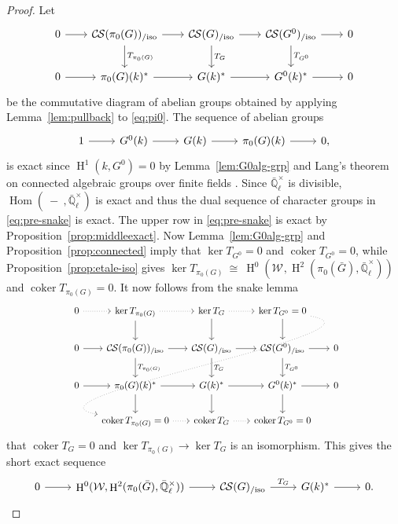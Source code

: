 \documentclass[10pt]{amsart}
\theoremstyle{plain}
\theoremstyle{definition}
\theoremstyle{remark}
\newcommand{\EE}{\mathbb{\bar Q}_\ell}
\newcommand{\Fq}{k}
\newcommand{\EEx}{\EE^\times}
\newcommand{\Weil}[1]{\mathcal{W}_{#1}}
\DeclareMathOperator{\Hom}{Hom}
\DeclareMathOperator{\coker}{coker}
\DeclareMathOperator{\Hh}{H}
\newcommand{\iso}{{\ \cong\ }}
\newcommand{\TrFrob}[1]{T_{#1}}
\newcommand{\CS}{{\mathcal{C\hskip-0.8pt S}}}
\newcommand{\CSiso}[1]{\CS(#1)_{/\text{iso}}}
\newcommand{\bG}{\bar{G}}
\begin{document}
\begin{proof}
  Let
  \begin{equation}\label{eq:pre-snake}
  \begin{tikzcd}[row sep=20, column sep=20]
    0 \rar & \CSiso{\pi_0(G)} \rar \dar{\TrFrob{\pi_0(G)}}
    & \CSiso{G} \rar \dar{\TrFrob{G}} & \CSiso{G^0} \rar \dar{\TrFrob{G^0}} & 0\\
    0 \rar & \pi_0(G)(\Fq)^* \rar
    &  G(\Fq)^* \rar & G^0(\Fq)^* \rar & 0
  \end{tikzcd}
  \end{equation}
  be the commutative diagram of abelian groups obtained by applying
  Lemma~\ref{lem:pullback} to \eqref{eq:pi0}.
  The sequence of abelian groups
\[
  \begin{tikzcd}
    1 \rar & G^0(\Fq) \rar & G(\Fq) \rar & \pi_0(G)(\Fq) \rar & 0,
  \end{tikzcd}
\]
  is exact since $\Hh^1(\Fq,G^0) =0$ by Lemma~\ref{lem:G0alg-grp} and Lang's theorem on connected algebraic groups over finite fields \cite{lang:56a}.
  Since $\EEx$ is divisible, $\Hom(\ - \ ,\EEx)$ is exact and thus the dual sequence of
  character groups in \eqref{eq:pre-snake} is exact.
%
  The upper row in \eqref{eq:pre-snake} is exact by Proposition~\ref{prop:middleexact}.
  Now Lemma~\ref{lem:G0alg-grp} and Proposition~\ref{prop:connected}
  imply that $\ker \TrFrob{G^0} =0$ and $\coker \TrFrob{G^0}=0$,
  while Proposition~\ref{prop:etale-iso} gives $\ker \TrFrob{\pi_0(G)} \iso \Hh^0(\Weil{},\Hh^2(\pi_0({\bar G}),\EEx))$
  and $\coker \TrFrob{\pi_0(G)}=0$.
It now follows from the snake lemma
 \[
  \begin{tikzcd}[row sep=20, column sep=15]
    0 \arrow[dotted]{r} & \ker \TrFrob{\pi_0(G)} \arrow[dotted]{r} \dar & \arrow{d} \ker \TrFrob{G} \arrow[dotted]{r} & \ker \TrFrob{G^0} =0 \arrow[dotted, out=-10, in=170]{dddll} \dar & \\
    0 \rar & \CSiso{\pi_0(G)} \rar \dar{\TrFrob{\pi_0(G)}}
    & \CSiso{G} \rar \dar{\TrFrob{G}} & \CSiso{G^0} \rar \dar{\TrFrob{G^0}} & 0\\
    0 \rar & \pi_0(G)(\Fq)^* \rar \dar
    & \arrow{d} G(\Fq)^* \rar & G^0(\Fq)^* \rar \dar & 0\\
   &  \coker \TrFrob{\pi_0(G)} =0 \arrow[dotted]{r} & \coker \TrFrob{G} \arrow[dotted]{r} & \coker \TrFrob{G^0} =0 & 
  \end{tikzcd}
  \]
that $\coker \TrFrob{G} =0$
and $\ker \TrFrob{\pi_0(G)} \to \ker \TrFrob{G}$ is an isomorphism.
This gives the short exact sequence
\[
  \begin{tikzcd}
0 \arrow{r} & \Hh^0(\Weil{},\Hh^2(\pi_0(\bG),\EEx)) \arrow{r} & \CSiso{G} \arrow{r}{\TrFrob{G}} & G(\Fq)^* \arrow{r} & 0. 
  \end{tikzcd}
\]
\end{proof}
\end{document}
